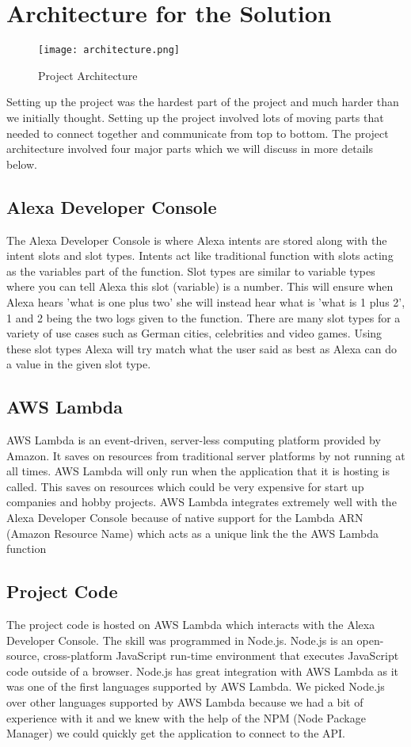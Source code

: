 \chapter{Architecture for the Solution}
\begin{figure}[h!]
  \texttt{[image: architecture.png]}
  \caption{Project Architecture}
  \label{fig:projectarchitecture}
\end{figure}

Setting up the project was the hardest part of the project and much harder than we initially thought. Setting up the project involved lots of moving parts that needed to connect together and communicate from top to bottom. The project architecture involved four major parts which we will discuss in more details below. 

\section{Alexa Developer Console}
The Alexa Developer Console is where Alexa intents are stored along with the intent slots and slot types. Intents act like traditional function with slots acting as the variables part of the function. Slot types are similar to variable types where you can tell Alexa this slot (variable) is a number. This will ensure when Alexa hears 'what is one plus two' she will instead hear what is 'what is 1 plus 2', 1 and 2 being the two logs given to the function. There are many slot types for a variety of use cases such as German cities, celebrities and video games. Using these slot types Alexa will try match what the user said as best as Alexa can do a value in the given slot type.

\section{AWS Lambda}
AWS Lambda is an event-driven, server-less computing platform provided by Amazon. It saves on resources from traditional server platforms by not running at all times.
AWS Lambda will only run when the application that it is hosting is called. This saves on resources which could be very expensive for start up companies and hobby projects. AWS Lambda integrates extremely well with the Alexa Developer Console because of native support for the Lambda ARN (Amazon Resource Name) which acts as a unique link the the AWS Lambda function

\section{Project Code}
The project code is hosted on AWS Lambda which interacts with the Alexa Developer Console. The skill was programmed in Node.js.  Node.js is an open-source, cross-platform JavaScript run-time environment that executes JavaScript code outside of a browser. Node.js has great integration with AWS Lambda as it was one of the first languages supported by AWS Lambda. We picked Node.js over other languages supported by AWS Lambda because we had a bit of experience with it and we knew with the help of the NPM (Node Package Manager) we could quickly get the application to connect to the API. 

